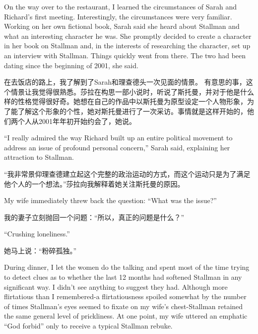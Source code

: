\ifdefined\eng
On the way over to the restaurant, I learned the circumstances of Sarah and Richard's first meeting. Interestingly, the circumstances were very familiar. Working on her own fictional book, Sarah said she heard about Stallman and what an interesting character he was. She promptly decided to create a character in her book on Stallman and, in the interests of researching the character, set up an interview with Stallman. Things quickly went from there. The two had been dating since the beginning of 2001, she said.
\fi

\ifdefined\chs
在去饭店的路上，我了解到了Sarah和理查德头一次见面的情景。 有意思的事，这个情景让我觉得很熟悉。莎拉在构思一部小说时，听说了斯托曼，并对于他是什么样的性格觉得很好奇。她想在自己的作品中以斯托曼为原型设定一个人物形象，为了能了解这个形象的个性，她对斯托曼进行了一次采访。事情就是这样开始的，他们两个人从2001年年初开始约会了，她说。
\fi

\ifdefined\eng
``I really admired the way Richard built up an entire political movement to address an issue of profound personal concern,'' Sarah said, explaining her attraction to Stallman.
\fi

\ifdefined\chs
“我非常景仰理查德建立起这个完整的政治运动的方式，而这个运动只是为了满足他个人的一个想法。”莎拉向我解释着她关注斯托曼的原因。
\fi

\ifdefined\eng
My wife immediately threw back the question: ``What was the issue?''
\fi

\ifdefined\chs
我的妻子立刻抛回一个问题：“所以，真正的问题是什么？”
\fi

\ifdefined\eng
``Crushing loneliness.''
\fi

\ifdefined\chs
她马上说：“粉碎孤独。”
\fi

\ifdefined\eng
During dinner, I let the women do the talking and spent most of the time trying to detect clues as to whether the last 12 months had softened Stallman in any significant way. I didn't see anything to suggest they had. Although more flirtatious than I remembered-a flirtatiousness spoiled somewhat by the number of times Stallman's eyes seemed to fixate on my wife's chest-Stallman retained the same general level of prickliness. At one point, my wife uttered an emphatic ``God forbid'' only to receive a typical Stallman rebuke.
\fi

